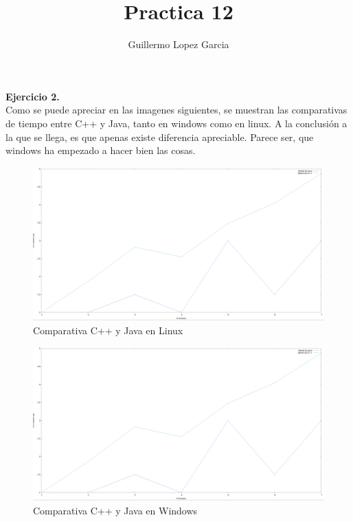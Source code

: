 \documentclass[]{article}
\title{Practica 12}
\author{Guillermo Lopez Garcia}
\begin{document}
\maketitle

\textbf{Ejercicio 2.} \\

Como se puede apreciar en las imagenes siguientes, se muestran las comparativas de tiempo entre C++ y Java, tanto en windows
como en linux. A la conclusión a la que se llega, es que apenas existe diferencia apreciable. Parece ser, que windows ha
empezado a hacer bien las cosas.

\begin{figure}
  \includegraphics[width=\linewidth]{linux.png}
  \caption{Comparativa C++ y Java en Linux}
\label{fig:comp}
\end{figure}

\begin{figure}
  \includegraphics[width=\linewidth]{windows.png}
  \caption{Comparativa C++ y Java en Windows}
\label{fig:comp}
\end{figure}
\end{document}
